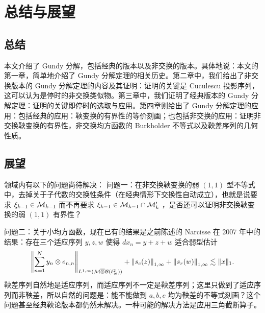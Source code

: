 \chapter{总结与展望}
\section{总结}

本文介绍了 Gundy 分解，包括经典的版本以及非交换的版本。具体地说：本文的第一章，简单地介绍了 Gundy 分解定理的相关历史。第二章中，我们给出了非交换版本的 Gundy 分解定理的内容及其证明：证明的关键是 Cuculescu 投影序列，这可以认为是停时的非交换类似物。第三章中，我们证明了经典版本的 Gundy 分解定理：证明的关键即停时的选取与应用。第四章则给出了 Gundy 分解定理的应用：包括经典的应用：鞅变换的有界性的等价刻画；也包括非交换的应用：证明非交换鞅变换的有界性，非交换均方函数的 Burkholder 不等式以及鞅差序列的几何性质。
\section{展望}
领域内有以下的问题尚待解决：
问题一：在非交换鞅变换的弱 $(1,1)$ 型不等式中，去掉关于子代数的交换性条件（在经典情形下交换性自动成立），也就是说要求 $ \xi_{k-1}\in \mathcal{M}_{k-1} $ 而不再要求 $ \xi_{k-1}\in \mathcal{M}_{k-1}\cap \mathcal{M}_{k}^\prime$ ，是否还可以证明非交换鞅变换的弱 $(1,1)$ 有界性？

问题二：关于小均方函数，现在已有的结果是之前陈述的 Narcisse 在 2007 年中的结果\cite{MR2319715-2007-Narcisse-Conditioned-square-functions}：存在三个适应序列 $y,z,w$ 使得 $dx_n=y+z+w$ 适合弱型估计
\[  \left|\!\left|\sum_{n=1}^N y_n\otimes e_{n,n}\right|\!\right|_{L^{1,\infty}(\mathcal{M}\overline{\otimes} \mathcal{B}(\ell^2_N))}+\left\| s_c(z) \right\|_{1,\infty}+\left\| s_r(w) \right\|_{1,\infty}\lesssim\|x\|_1. \]
鞅差序列自然地是适应序列，而适应序列不一定是鞅差序列；这里只做到了适应序列而非鞅差，所以自然的问题是：能不能做到 $a,b,c$ 均为鞅差的不等式刻画？这个问题甚至经典鞅论版本都仍然未解决。一种可能的解决方法是应用三角截断算子。

